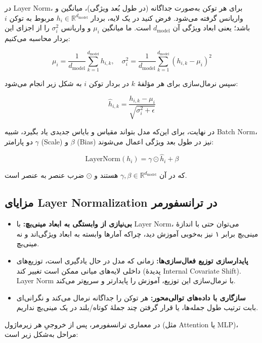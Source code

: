در Layer Norm، برای هر توکن به‌صورت جداگانه (در طول بُعد ویژگی)، میانگین و واریانس گرفته می‌شود.
فرض کنید در یک لایه، بردار \( h_i \in \mathbb{R}^{d_{\text{model}}} \) مربوط به توکن \( i \) باشد؛ یعنی ابعاد ویژگی آن \( d_{\text{model}} \) است. ما میانگین \( \mu_i \) و واریانس \( \sigma_i^2 \) را از اجزای این بردار محاسبه می‌کنیم:

\[
\mu_i = \frac{1}{d_{\text{model}}} \sum_{k=1}^{d_{\text{model}}} h_{i,k}, \quad
\sigma_i^2 = \frac{1}{d_{\text{model}}} \sum_{k=1}^{d_{\text{model}}} (h_{i,k} - \mu_i)^2
\]

سپس نرمال‌سازی برای هر مؤلفهٔ \( k \) در بردار توکن \( i \) به شکل زیر انجام می‌شود:

\[
\hat{h}_{i,k} = \frac{h_{i,k} - \mu_i}{\sqrt{\sigma_i^2 + \epsilon}}
\]

در نهایت، برای این‌که مدل بتواند مقیاس و بایاس جدیدی یاد بگیرد، شبیه Batch Norm، دو پارامتر \( \gamma \) (Scale) و \( \beta \) (Bias) نیز در طول بعد ویژگی اعمال می‌شوند:

\[
\text{LayerNorm}(h_i) = \gamma \odot \hat{h}_i + \beta
\]

که در آن \( \gamma, \beta \in \mathbb{R}^{d_{\text{model}}} \) هستند و \( \odot \) ضرب عنصر به عنصر است.

\subsection*{مزایای Layer Normalization در ترانسفورمر}

\begin{itemize}
	\item \textbf{بی‌نیازی از وابستگی به ابعاد مینی‌بچ:}  
	با Layer Norm، می‌توان حتی با اندازهٔ مینی‌بچ برابر ۱ نیز به‌خوبی آموزش دید، چراکه آمارها وابسته به ابعاد ویژگی‌اند و نه مینی‌بچ.
	
	\item \textbf{پایدارسازی توزیع فعال‌سازی‌ها:}  
	زمانی که مدل در حال یادگیری است، توزیع‌های داخلی لایه‌های میانی ممکن است تغییر کند (پدیدهٔ Internal Covariate Shift). Layer Norm با نرمال‌سازی این توزیع، آموزش را پایدارتر و سریع‌تر می‌کند.
	
	\item \textbf{سازگاری با داده‌های توالی‌محور:}  
	هر توکن را جداگانه نرمال می‌کند و نگرانی‌ای بابت ترتیب طول جمله‌ها، یا قرار گرفتن چند جملهٔ کوتاه/بلند در یک مینی‌بچ نداریم.
\end{itemize}





در معماری ترانسفورمر، پس از خروجیِ هر زیرماژول (مثل Attention یا MLP)، مراحل به‌شکل زیر است:

